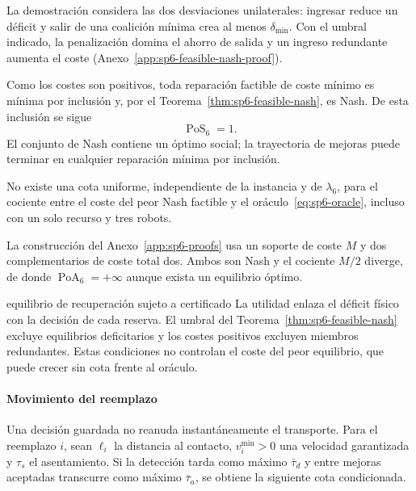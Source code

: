 La demostración considera las dos desviaciones unilaterales: ingresar reduce un déficit y salir de una coalición mínima crea al menos $\delta_{\min}$. Con el umbral indicado, la penalización domina el ahorro de salida y un ingreso redundante aumenta el coste (Anexo~\ref{app:sp6-feasible-nash-proof}).

Como los costes son positivos, toda reparación factible de coste mínimo es mínima por inclusión y, por el Teorema~\ref{thm:sp6-feasible-nash}, es Nash. De esta inclusión se sigue
\begin{equation}
 \operatorname{PoS}_6=1.
 \label{eq:sp6-pos}
\end{equation}
El conjunto de Nash contiene un óptimo social; la trayectoria de mejoras puede terminar en cualquier reparación mínima por inclusión.

\begin{proposicion}
\label{prop:sp6-unbounded-poa}
No existe una cota uniforme, independiente de la instancia y de $\lambda_6$, para el cociente entre el coste del peor Nash factible y el oráculo~\eqref{eq:sp6-oracle}, incluso con un solo recurso y tres robots.
\end{proposicion}

La construcción del Anexo~\ref{app:sp6-proofs} usa un soporte de coste $M$ y dos complementarios de coste total dos. Ambos son Nash y el cociente $M/2$ diverge, de donde $\operatorname{PoA}_6=+\infty$ aunque exista un equilibrio óptimo.

\begin{contribucion}{equilibrio de recuperación sujeto a certificado}
La utilidad enlaza el déficit físico con la decisión de cada reserva. El umbral del Teorema~\ref{thm:sp6-feasible-nash} excluye equilibrios deficitarios y los costes positivos excluyen miembros redundantes. Estas condiciones no controlan el coste del peor equilibrio, que puede crecer sin cota frente al oráculo.
\end{contribucion}

\paragraph{Movimiento del reemplazo}

Una decisión guardada no reanuda instantáneamente el transporte. Para el reemplazo $i$, sean $\ell_i$ la distancia al contacto, $v_i^{\min}>0$ una velocidad garantizada y $\tau_s$ el asentamiento. Si la detección tarda como máximo $\bar\tau_d$ y entre mejoras aceptadas transcurre como máximo $\bar\tau_a$, se obtiene la siguiente cota condicionada.

